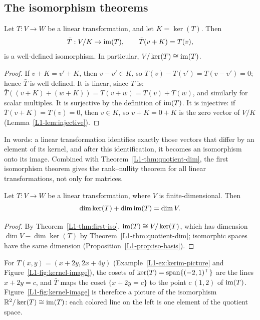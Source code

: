 \subsection{The isomorphism theorems}

\begin{theorem}\label{L1-thm:first-iso}
    Let $T: V \to W$ be a linear transformation, and let $K = \ker(T)$. Then
    \[\bar{T}: V/K \to \operatorname{im}(T), \qquad \bar{T}(v + K) = T(v),\]
    is a well-defined isomorphism. In particular, $V/\ker(T) \cong \operatorname{im}(T)$.
\end{theorem}

\begin{proof}
    If $v + K = v' + K$, then $v - v' \in K$, so $T(v) - T(v') = T(v - v') = 0$; hence $\bar{T}$ is well defined. It is linear, since $T$ is: $\bar{T}((v + K) + (w + K)) = T(v + w) = T(v) + T(w)$, and similarly for scalar multiples. It is surjective by the definition of $\operatorname{im}(T)$. It is injective: if $\bar{T}(v + K) = T(v) = 0$, then $v \in K$, so $v + K = 0 + K$ is the zero vector of $V/K$ (Lemma~\ref{L1-lem:injective}).
\end{proof}

In words: a linear transformation identifies exactly those vectors that differ by an element of its kernel, and after this identification, it becomes an isomorphism onto its image. Combined with Theorem~\ref{L1-thm:quotient-dim}, the first isomorphism theorem gives the rank--nullity theorem for all linear transformations, not only for matrices.

\begin{corollary}\label{L1-cor:rank-nullity-general}
    Let $T: V \to W$ be a linear transformation, where $V$ is finite-dimensional. Then
    \[\dim \ker(T) + \dim \operatorname{im}(T) = \dim V.\]
\end{corollary}

\begin{proof}
    By Theorem~\ref{L1-thm:first-iso}, $\operatorname{im}(T) \cong V/\ker(T)$, which has dimension $\dim V - \dim \ker(T)$ by Theorem~\ref{L1-thm:quotient-dim}; isomorphic spaces have the same dimension (Proposition~\ref{L1-prop:iso-basis}).
\end{proof}

\begin{example}
    For $T(x, y) = (x + 2y, 2x + 4y)$ (Example~\ref{L1-ex:kerim-picture} and Figure~\ref{L1-fig:kernel-image}), the cosets of $\ker(T) = \operatorname{span}\{(-2, 1)^\top\}$ are the lines $x + 2y = c$, and $\bar{T}$ maps the coset $\{x + 2y = c\}$ to the point $c\,(1, 2)$ of $\operatorname{im}(T)$. Figure~\ref{L1-fig:kernel-image} is therefore a picture of the isomorphism $\mathbb{R}^2/\ker(T) \cong \operatorname{im}(T)$: each colored line on the left is one element of the quotient space.
\end{example}

